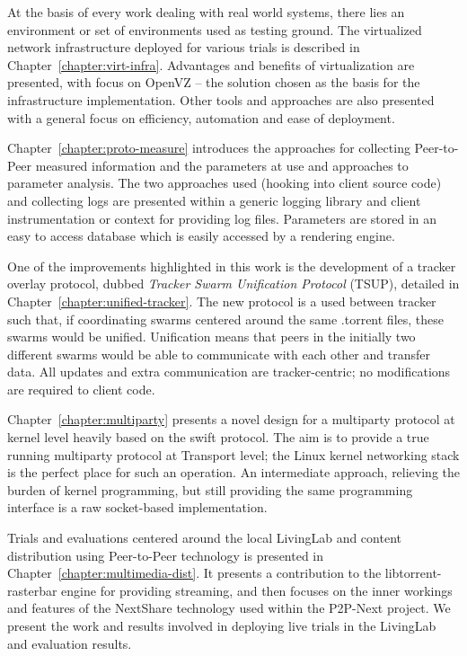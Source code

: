 At the basis of every work dealing with real world systems, there lies an
environment or set of environments used as testing ground. The virtualized
network infrastructure deployed for various trials is described in
Chapter~\ref{chapter:virt-infra}. Advantages and benefits of virtualization
are presented, with focus on OpenVZ -- the solution chosen as the basis for
the infrastructure implementation. Other tools and approaches are also
presented with a general focus on efficiency, automation and ease of
deployment.

Chapter~\ref{chapter:proto-measure} introduces the approaches for collecting
Peer-to-Peer measured information and the parameters at use and approaches to
parameter analysis. The two approaches used (hooking into client source code)
and collecting logs are presented within a generic logging library and client
instrumentation or context for providing log files. Parameters are stored in
an easy to access database which is easily accessed by a rendering engine.

One of the improvements highlighted in this work is the development of a
tracker overlay protocol, dubbed \textit{Tracker Swarm Unification Protocol}
(TSUP), detailed in Chapter~\ref{chapter:unified-tracker}. The new protocol is
a used between tracker such that, if coordinating swarms centered around the
same .torrent files, these swarms would be unified. Unification means that
peers in the initially two different swarms would be able to communicate with
each other and transfer data. All updates and extra communication are
tracker-centric; no modifications are required to client code.

Chapter~\ref{chapter:multiparty} presents a novel design for a multiparty
protocol at kernel level heavily based on the swift protocol. The aim is to
provide a true running multiparty protocol at Transport level; the Linux
kernel networking stack is the perfect place for such an operation. An
intermediate approach, relieving the burden of kernel programming, but still
providing the same programming interface is a raw socket-based implementation.

Trials and evaluations centered around the local LivingLab and content
distribution using Peer-to-Peer technology is presented in
Chapter~\ref{chapter:multimedia-dist}. It presents a contribution to the
libtorrent-rasterbar engine for providing streaming, and then focuses on the
inner workings and features of the NextShare technology used within the
P2P-Next project. We present the work and results involved in deploying live
trials in the LivingLab and evaluation results.

